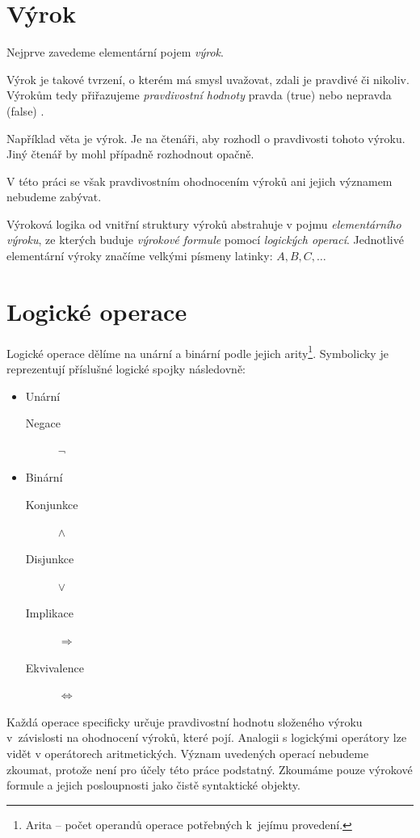 \documentclass[thesis=B,czech,hidelinks]{thesis}[2012/06/26]
\begin{document}
\section{Výrok}

Nejprve zavedeme elementární pojem \emph{výrok}.

Výrok je takové tvrzení, o kterém má smysl uvažovat, zdali je pravdivé či nikoliv. Výrokům tedy přiřazujeme \emph{pravdivostní hodnoty} pravda (true) nebo nepravda (false) \cite{sochor}.

\begin{exm}
Například věta  je výrok. Je na čtenáři, aby rozhodl o pravdivosti tohoto výroku. Jiný čtenář by mohl případně rozhodnout opačně.
\end{exm}
 
V této práci se však pravdivostním ohodnocením výroků ani jejich významem nebudeme zabývat.

Výroková logika od vnitřní struktury výroků abstrahuje v pojmu \emph{elementárního výroku}, ze kterých buduje \emph{výrokové formule} pomocí \emph{logických operací}. Jednotlivé elementární výroky značíme velkými písmeny latinky: $A, B, C, \ldots$

\section{Logické operace}

Logické operace dělíme na unární a binární podle jejich arity\footnote{Arita -- počet operandů operace potřebných k~jejímu provedení.}. Symbolicky je reprezentují příslušné logické spojky následovně:

\begin{itemize}
	\item Unární
	\begin{description}
		\item[Negace] $\neg$
	\end{description}
	\item Binární
	\begin{description}
		\item[Konjunkce] $\wedge$
		\item[Disjunkce] $\vee$
		\item[Implikace] $\Rightarrow$
		\item[Ekvivalence] $\Leftrightarrow$
	\end{description}
\end{itemize}

Každá operace specificky určuje pravdivostní hodnotu složeného výroku v~závislosti na ohodnocení výroků, které pojí. Analogii s logickými operátory lze vidět v operátorech aritmetických. Význam uvedených operací nebudeme zkoumat, protože není pro účely této práce podstatný. Zkoumáme pouze výrokové formule a jejich posloupnosti jako čistě syntaktické objekty.
\end{document}
